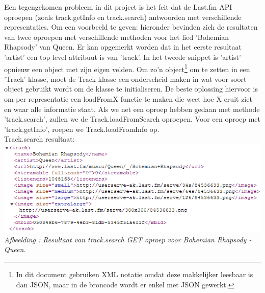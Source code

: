 \documentclass[11pt,a4paper]{article}
\newcounter{figc}
\newcommand{\figID} {%
   \stepcounter{figc}%
   \thefigc}
\begin{document}
	Een tegengekomen probleem in dit project is het feit dat de Last.fm API oproepen (zoals track.getInfo en track.search) antwoorden met verschillende representaties. Om een voorbeeld te geven: hieronder bevinden zich de resultaten van twee oproepen met verschillende methoden voor het lied 'Bohemian Rhapsody' van Queen. Er kan opgemerkt worden dat in het eerste resultaat 'artist' een top level attribuut is van 'track'. In het tweede snippet is 'artist' opnieuw een object met zijn eigen velden. Om zo'n object\footnote{In dit document gebruiken XML notatie omdat deze makkelijker leesbaar is dan JSON, maar in de broncode wordt er enkel met JSON gewerkt.} om te zetten in een 'Track' klasse, moet de Track klasse een onderscheid maken in wat voor soort object gebruikt wordt om de klasse te initialiseren. De beste oplossing hiervoor is om per representatie een loadFromX functie te maken die weet hoe X eruit ziet en waar alle informatie staat. Als we net een oproep hebben gedaan met methode 'track.search', zullen we de Track.loadFromSearch oproepen. Voor een oproep met 'track.getInfo', roepen we Track.loadFromInfo op. \\
	
	Track.search resultaat:\\
	\includegraphics[width=15cm]{Pictures/track_search.png} \\ \newline
	\small \textit{Afbeelding \figID : Resultaat van track.search GET oproep voor Bohemian Rhapsody - Queen.} \\
\end{document}
